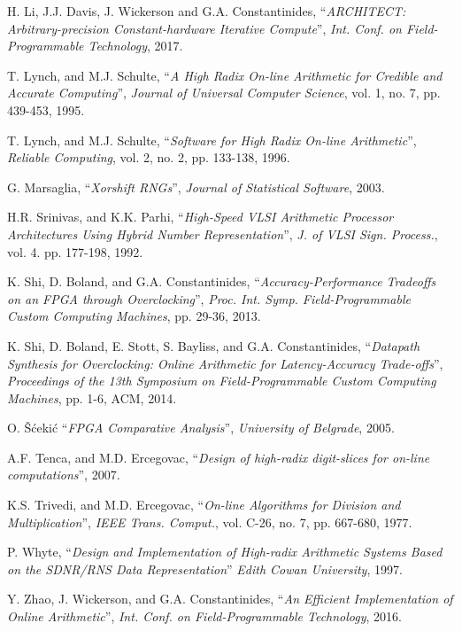 \begin{thebibliography}{1}
  H. Li, J.J. Davis, J. Wickerson and G.A. Constantinides,
  ``\textit{ARCHITECT: Arbitrary-precision Constant-hardware Iterative
  Compute}'',
  \textit{Int. Conf. on Field-Programmable Technology},
  2017.

  T. Lynch, and M.J. Schulte,
  ``\textit{A High Radix On-line Arithmetic for Credible and Accurate
  Computing}'',
  \textit{Journal of Universal Computer Science}, vol. 1, no. 7, pp. 439-453,
  1995.

  T. Lynch, and M.J. Schulte,
  ``\textit{Software for High Radix On-line Arithmetic}'',
  \textit{Reliable Computing}, vol. 2, no. 2, pp. 133-138,
  1996.

  G. Marsaglia,
  ``\textit{Xorshift RNGs}'',
  \textit{Journal of Statistical Software},
  2003.

  H.R. Srinivas, and K.K. Parhi,
  ``\textit{High-Speed VLSI Arithmetic Processor Architectures Using Hybrid
  Number Representation}'',
  \textit{J. of VLSI Sign. Process.}, vol. 4. pp. 177-198,
  1992.

  K. Shi, D. Boland, and G.A. Constantinides,
  ``\textit{Accuracy-Performance Tradeoffs on an FPGA through Overclocking}'',
  \textit{Proc. Int. Symp. Field-Programmable Custom Computing Machines},
  pp. 29-36,
  2013.

  K. Shi, D. Boland, E. Stott, S. Bayliss, and G.A. Constantinides,
  ``\textit{Datapath Synthesis for Overclocking: Online Arithmetic for
  Latency-Accuracy Trade-offs}'',
  \textit{Proceedings of the 13th Symposium on Field-Programmable Custom
  Computing Machines},
  pp. 1-6, ACM,
  2014.

  O. Šćekić
  ``\textit{FPGA Comparative Analysis}'',
  \textit{University of Belgrade},
  2005.

  A.F. Tenca, and M.D. Ercegovac,
  ``\textit{Design of high-radix digit-slices for on-line computations}'',
  2007.

  K.S. Trivedi, and M.D. Ercegovac,
  ``\textit{On-line Algorithms for Division and Multiplication}'',
  \textit{IEEE Trans. Comput.}, vol. C-26, no. 7, pp. 667-680,
  1977.

  P. Whyte,
  ``\textit{Design and Implementation of High-radix Arithmetic Systems Based
  on the SDNR/RNS Data Representation}''
  \textit{Edith Cowan University},
  1997.

  Y. Zhao, J. Wickerson, and G.A. Constantinides,
  ``\textit{An Efficient Implementation of Online Arithmetic}'',
  \textit{Int. Conf. on Field-Programmable Technology},
  2016.


\end{thebibliography}
